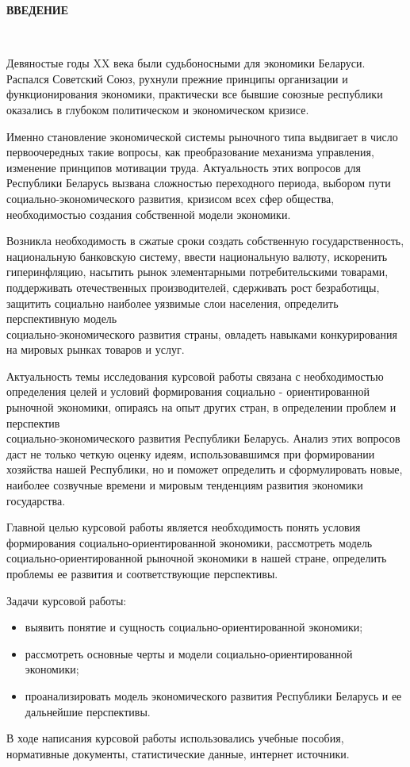 \documentclass[14pt,a4paper]{article}
\begin{document}
    \newpage
    \begin{center}
        \textbf{\LARGE{ВВЕДЕНИЕ}}
    \end{center}
    \\
    \par
    Девяностые годы XX века были судьбоносными для экономики Беларуси. Распался Советский Союз, рухнули прежние принципы организации и функционирования экономики, практически все бывшие союзные республики оказались в глубоком политическом и экономическом кризисе.
    \par
    Именно становление экономической системы рыночного типа выдвигает в число первоочередных такие вопросы, как преобразование механизма управления, изменение принципов мотивации труда. Актуальность этих вопросов для Республики Беларусь вызвана сложностью переходного периода, выбором пути социально-экономического развития, кризисом всех сфер общества, необходимостью создания собственной модели экономики.
    \par
    Возникла необходимость в сжатые сроки создать собственную государственность, национальную банковскую систему, ввести национальную валюту, искоренить гиперинфляцию, насытить рынок элементарными потребительскими товарами, поддерживать отечественных производителей, сдерживать рост безработицы, защитить социально наиболее уязвимые слои населения, определить перспективную модель\\ социально-экономического развития страны, овладеть навыками конкурирования на мировых рынках товаров и услуг.
    \par
    Актуальность темы исследования курсовой работы связана с необходимостью определения целей и условий формирования социально - ориентированной рыночной экономики, опираясь на опыт других стран, в определении проблем и перспектив\\ социально-экономического развития Республики Беларусь. Анализ этих вопросов даст не только четкую оценку идеям, использовавшимся при формировании хозяйства нашей Республики, но и поможет определить и сформулировать новые, наиболее созвучные времени и мировым тенденциям развития экономики государства.
    \par
    Главной целью курсовой работы является необходимость понять условия формирования социально-ориентированной экономики, рассмотреть модель социально-ориентированной рыночной экономики в нашей стране, определить проблемы ее развития и соответствующие перспективы.
    \par
    Задачи курсовой работы:
    \begin{itemize}
        \item выявить понятие и сущность социально-ориентированной экономики;
        \item рассмотреть основные черты и модели социально-ориентированной экономики;
        \item проанализировать модель экономического развития Республики Беларусь и ее дальнейшие перспективы.
    \end{itemize}
    \par
    В ходе написания курсовой работы использовались учебные пособия, нормативные документы, статистические данные, интернет источники.
\end{document}
